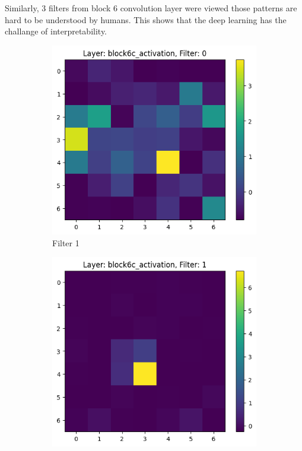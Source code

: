 Similarly, 3 filters from block 6 convolution layer were viewed those patterns are hard to be understood by humans. This shows that the deep learning has the challange of interpretability.
\begin{figure}[h]
    \centering
    \begin{subfigure}[b]{0.3\textwidth}
        \centering
        \includegraphics[width=\textwidth]{images/filter 0block6a_activation.png}
        \caption{Filter 1}
        \label{fig:filter1}
    \end{subfigure}
    \begin{subfigure}[b]{0.3\textwidth}
        \centering
        \includegraphics[width=\textwidth]{images/filter 1block6a_activation.png}

\end{subfigure}
\end{figure}

